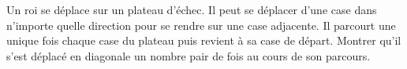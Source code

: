Un roi se déplace sur un plateau d'échec. Il peut se déplacer d'une case dans n'importe quelle direction pour se rendre sur une case adjacente. Il parcourt une unique fois chaque case du plateau puis revient à sa case de départ. Montrer qu'il s'est déplacé en diagonale un nombre pair de fois au cours de son parcours.